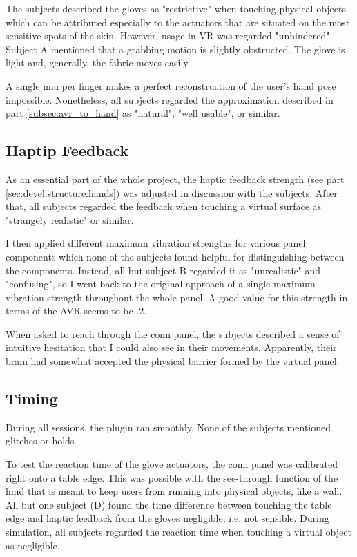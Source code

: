 \documentclass[hyperref, bachelorofscience]{cgvpub}
\begin{document}
The subjects described the gloves as "restrictive" when touching physical objects which can be attributed especially to the actuators that are situated on the most sensitive spots of the skin. However, usage in VR was regarded "unhindered". Subject A mentioned that a grabbing motion is slightly obstructed. The glove is light and, generally, the fabric moves easily. 

A single \acrshort{imu} per finger makes a perfect reconstruction of the user's hand pose impossible. Nonetheless, all subjects regarded the approximation described in part \ref{subsec:avr_to_hand} as "natural", "well usable", or similar.

\subsection{Haptip Feedback}
As an essential part of the whole project, the haptic feedback strength (see part \ref{sec:devel:structure:hands}) was adjusted in discussion with the subjects. After that, all subjects regarded the feedback when touching a virtual surface as "strangely realistic" or similar. 

I then applied different maximum vibration strengths for various panel components which none of the subjects found helpful for distinguishing between the components. Instead, all but subject B regarded it as "unrealistic" and "confusing", so I went back to the original approach of a single maximum vibration strength throughout the whole panel. A good value for this strength in terms of the \Gls{AVR} seems to be $ .2 $.

When asked to reach through the conn panel, the subjects described a sense of intuitive hesitation that I could also see in their movements. Apparently, their brain had somewhat accepted the physical barrier formed by the virtual panel. 

\subsection{Timing}
During all sessions, the plugin ran smoothly. None of the subjects mentioned glitches or holds. 

To test the reaction time of the glove actuators, the conn panel was calibrated right onto a table edge. This was possible with the see-through function of the \acrshort{hmd} that is meant to keep users from running into physical objects, like a wall. All but one subject (D) found the time difference between touching the table edge and haptic feedback from the gloves negligible, i.e. not sensible. During simulation, all subjects regarded the reaction time when touching a virtual object as negligible.
\end{document}
